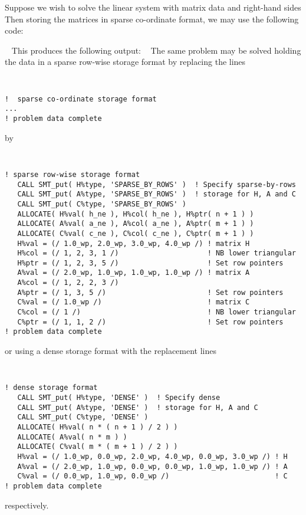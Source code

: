 \documentclass{galahad}
\begin{document}

\galexample
Suppose we wish to solve the linear system  with matrix data
and right-hand sides
Then storing the matrices in sparse co-ordinate format,
we may use the following code:

{\tt \small
\VerbatimInput{\packageexample}
}
\noindent
This produces the following output:
{\tt \small
\VerbatimInput{\packageresults}
}
\noindent
The same problem may be solved holding the data in
a sparse row-wise storage format by replacing the lines
{\tt \small
\begin{verbatim}
!  sparse co-ordinate storage format
...
! problem data complete
\end{verbatim}
}
\noindent
by
{\tt \small
\begin{verbatim}
! sparse row-wise storage format
   CALL SMT_put( H%type, 'SPARSE_BY_ROWS' )  ! Specify sparse-by-rows
   CALL SMT_put( A%type, 'SPARSE_BY_ROWS' )  ! storage for H, A and C
   CALL SMT_put( C%type, 'SPARSE_BY_ROWS' )
   ALLOCATE( H%val( h_ne ), H%col( h_ne ), H%ptr( n + 1 ) )
   ALLOCATE( A%val( a_ne ), A%col( a_ne ), A%ptr( m + 1 ) )
   ALLOCATE( C%val( c_ne ), C%col( c_ne ), C%ptr( m + 1 ) )
   H%val = (/ 1.0_wp, 2.0_wp, 3.0_wp, 4.0_wp /) ! matrix H
   H%col = (/ 1, 2, 3, 1 /)                     ! NB lower triangular
   H%ptr = (/ 1, 2, 3, 5 /)                     ! Set row pointers
   A%val = (/ 2.0_wp, 1.0_wp, 1.0_wp, 1.0_wp /) ! matrix A
   A%col = (/ 1, 2, 2, 3 /)
   A%ptr = (/ 1, 3, 5 /)                        ! Set row pointers
   C%val = (/ 1.0_wp /)                         ! matrix C
   C%col = (/ 1 /)                              ! NB lower triangular
   C%ptr = (/ 1, 1, 2 /)                        ! Set row pointers
! problem data complete
\end{verbatim}
}
\noindent
or using a dense storage format with the replacement lines
{\tt \small
\begin{verbatim}
! dense storage format
   CALL SMT_put( H%type, 'DENSE' )  ! Specify dense
   CALL SMT_put( A%type, 'DENSE' )  ! storage for H, A and C
   CALL SMT_put( C%type, 'DENSE' )
   ALLOCATE( H%val( n * ( n + 1 ) / 2 ) )
   ALLOCATE( A%val( n * m ) )
   ALLOCATE( C%val( m * ( m + 1 ) / 2 ) )
   H%val = (/ 1.0_wp, 0.0_wp, 2.0_wp, 4.0_wp, 0.0_wp, 3.0_wp /) ! H
   A%val = (/ 2.0_wp, 1.0_wp, 0.0_wp, 0.0_wp, 1.0_wp, 1.0_wp /) ! A
   C%val = (/ 0.0_wp, 1.0_wp, 0.0_wp /)                         ! C
! problem data complete
\end{verbatim}
}
\noindent
respectively.
\end{document}
